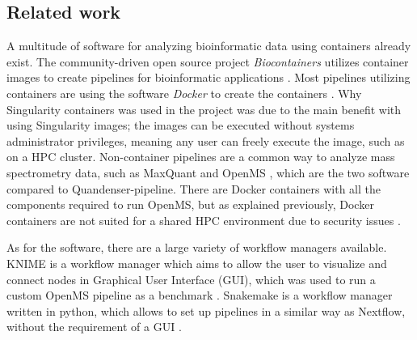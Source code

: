 \subsection{Related work}
A multitude of software for analyzing bioinformatic data using containers already exist. The community-driven open source project \textit{Biocontainers} utilizes container images to create pipelines for bioinformatic applications \cite{biocontainers}. Most pipelines utilizing containers are using the software \textit{Docker} to create the containers \cite{docker}. Why Singularity containers was used in the project was due to the main benefit with using Singularity images; the images can be executed without systems administrator privileges, meaning any user can freely execute the image, such as on a HPC cluster. Non-container pipelines are a common way to analyze mass spectrometry data, such as MaxQuant and OpenMS \cite{maxquant} \cite{openms}, which are the two software compared to Quandenser-pipeline. There are Docker containers with all the components required to run OpenMS, but as explained previously, Docker containers are not suited for a shared HPC environment due to security issues \cite{openms-hpc}.

As for the software, there are a large variety of workflow managers available. KNIME is a workflow manager which aims to allow the user to visualize and connect nodes in Graphical User Interface (GUI), which was used to run a custom OpenMS pipeline as a benchmark \cite{knime}. Snakemake is a workflow manager written in python, which allows to set up pipelines in a similar way as Nextflow, without the requirement of a GUI \cite{snakemake}.

